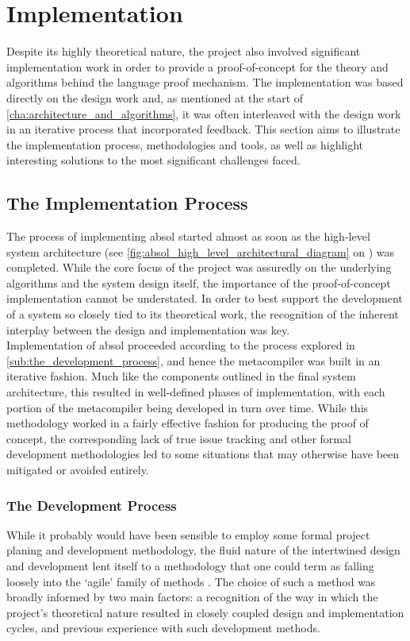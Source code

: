 \chapter{Implementation} %
\label{cha:implementation}
Despite its highly theoretical nature, the project also involved significant implementation work in order to provide a proof-of-concept for the theory and algorithms behind the language proof mechanism. 
The implementation was based directly on the design work and, as mentioned at the start of \autoref{cha:architecture_and_algorithms}, it was often interleaved with the design work in an iterative process that incorporated feedback. 
This section aims to illustrate the implementation process, methodologies and tools, as well as highlight interesting solutions to the most significant challenges faced. 

\section{The Implementation Process} %
\label{sec:the_implementation_process}
The process of implementing \gls{absol} started almost as soon as the high-level system architecture (see \autoref{fig:absol_high_level_architectural_diagram} on ) was completed. 
While the core focus of the project was assuredly on the underlying algorithms and the system design itself, the importance of the proof-of-concept implementation cannot be understated. 
In order to best support the development of a system so closely tied to its theoretical work, the recognition of the inherent interplay between the design and implementation was key. \\

Implementation of \gls{absol} proceeded according to the process explored in \autoref{sub:the_development_process}, and hence the metacompiler was built in an iterative fashion.
Much like the components outlined in the final system architecture, this resulted in well-defined phases of implementation, with each portion of the metacompiler being developed in turn over time. 
While this methodology worked in a fairly effective fashion for producing the proof of concept, the corresponding lack of true issue tracking and other formal development methodologies led to some situations that may otherwise have been mitigated or avoided entirely.

\subsection{The Development Process} %
\label{sub:the_development_process}
While it probably would have been sensible to employ some formal project planing and development methodology, the fluid nature of the intertwined design and development lent itself to a methodology that one could term as falling loosely into the `agile' family of methods \citep{fowler2001agile}.
The choice of such a method was broadly informed by two main factors: a recognition of the way in which the project's theoretical nature resulted in closely coupled design and implementation cycles, and previous experience with such development methods.\\

